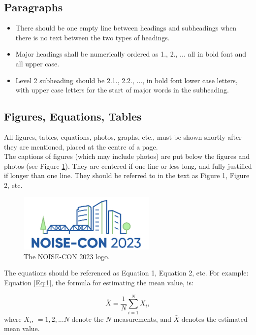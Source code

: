 \documentclass[letterpaper,12pt]{article}
\begin{document}
\subsection{Paragraphs}

\begin{itemize}[noitemsep]
\item
There should be one empty line between headings and subheadings when there is no text between the two types of headings. 
\item
Major headings shall be numerically ordered as 1., 2., ... all in bold font and all upper case.
\item
Level 2 subheading should be 2.1., 2.2., ..., in bold font lower case letters, with upper case letters for the start of major words in the subheading. 
\end{itemize}

\subsection{Figures, Equations, Tables}
\noindent
All figures, tables, equations, photos, graphs, etc., must be shown shortly after they are mentioned, placed at the centre of a page.  \\

The captions of figures (which may include photos) are put below the figures and photos (see Figure \ref{fig:1}).  They are centered if one line or less long, and fully justified if longer than one line.  They should be referred to in the text as Figure 1, Figure 2, etc. 
\begin{figure}[h!]
\begin{center}
  \includegraphics[width=2.65in]{logo_NC23.jpg}
  \end{center}
  \caption{The NOISE-CON 2023 logo.}
  \label{fig:1}
\end{figure}

The equations should be referenced as Equation 1, Equation 2, etc. For example:  Equation \ref{Eq:1}, the formula for estimating the mean value, is:

\begin{equation}
\bar{X} = \frac{1}{N} \sum_{i=1}^{N} X_i ,
\label{Eq:1}
\end{equation}
\noindent
where $X_i$, $=1,2,...N$ denote the $N$ measurements, and $\bar{X}$ denotes the estimated mean value. 
\\
\end{document}

